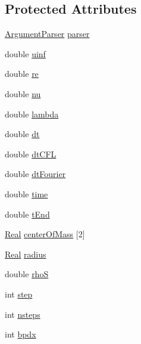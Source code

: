\subsection*{Protected Attributes}
\begin{DoxyCompactItemize}
\item 
\hyperlink{class_argument_parser}{Argument\+Parser} \hyperlink{class_sim___f_s_i___fixed_aaf006918f66045dbacd9d0392bd99bbd}{parser}
\item 
double \hyperlink{class_sim___f_s_i___fixed_adbebdb69690216b89cf81339ac4a5e0e}{uinf}
\item 
double \hyperlink{class_sim___f_s_i___fixed_a439d225a6a3f4dcba00ace7e66adb049}{re}
\item 
double \hyperlink{class_sim___f_s_i___fixed_a309a6019a5f0d5bb2eed40d2afc362e8}{nu}
\item 
double \hyperlink{class_sim___f_s_i___fixed_a6461a9422d734b3b546b664087717d75}{lambda}
\item 
double \hyperlink{class_sim___f_s_i___fixed_aac96337fe38ebde7c000b48e9cc8a5a9}{dt}
\item 
double \hyperlink{class_sim___f_s_i___fixed_a501b1373276553911410c679fa282b0d}{dt\+C\+F\+L}
\item 
double \hyperlink{class_sim___f_s_i___fixed_a5dea9750a2ba748dc420274b88f31f75}{dt\+Fourier}
\item 
double \hyperlink{class_sim___f_s_i___fixed_a3cfdaa1a00829b2784bcd6fccb3c09d2}{time}
\item 
double \hyperlink{class_sim___f_s_i___fixed_aa70a1ca13502295034e8c74b5d88413e}{t\+End}
\item 
\hyperlink{_h_d_f5_dumper_8h_a445a5f0e2a34c9d97d69a3c2d1957907}{Real} \hyperlink{class_sim___f_s_i___fixed_aadb42dd204f546f8bcf5dc3dbdad5d33}{center\+Of\+Mass} \mbox{[}2\mbox{]}
\item 
\hyperlink{_h_d_f5_dumper_8h_a445a5f0e2a34c9d97d69a3c2d1957907}{Real} \hyperlink{class_sim___f_s_i___fixed_a211f5bb78d0efa2871d5b6107e68d3a2}{radius}
\item 
double \hyperlink{class_sim___f_s_i___fixed_a4462b542d7cd03c08d02ab0c999696fd}{rho\+S}
\item 
int \hyperlink{class_sim___f_s_i___fixed_ab006780562c89322d5899acf98ba30fb}{step}
\item 
int \hyperlink{class_sim___f_s_i___fixed_a4a2d60194eb85b0719e3c24ba04201a6}{nsteps}
\item 
int \hyperlink{class_sim___f_s_i___fixed_a719f3cc786db8b65eee89d2d96b5a200}{bpdx}
\item 

\end{DoxyCompactItemize}
